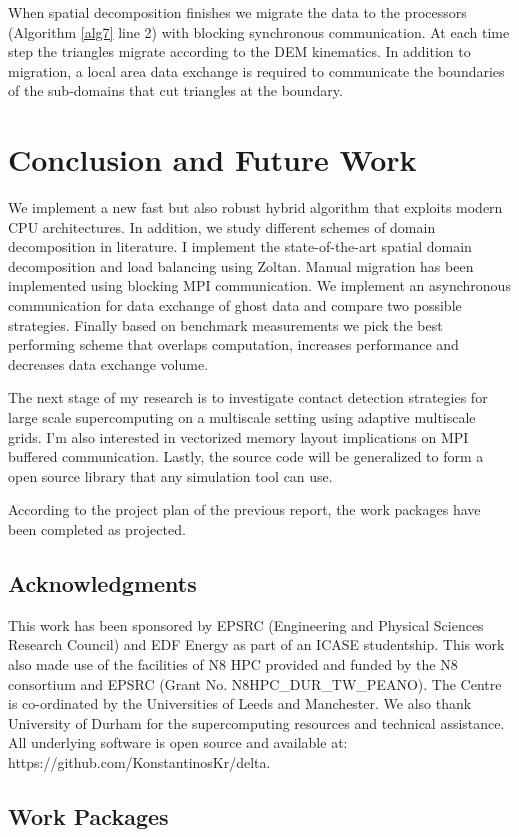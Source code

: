 \documentclass[times,12pt]{article}
\begin{document}
When spatial decomposition finishes we migrate the data to the processors (Algorithm \ref{alg7} line 2) with blocking synchronous communication. At each time step the triangles migrate according to the DEM kinematics. In addition to migration, a local area data exchange is required to communicate the boundaries of the sub-domains that cut triangles at the boundary. 

\section{Conclusion and Future Work}

We implement a new fast but also robust hybrid algorithm that exploits modern CPU architectures. In addition, we study different schemes of domain decomposition in literature. I implement the state-of-the-art spatial domain decomposition and load balancing using Zoltan. Manual migration has been implemented using blocking MPI communication. We implement an asynchronous communication for data exchange of ghost data and compare two possible strategies. Finally based on benchmark measurements we pick the best performing scheme that overlaps computation, increases performance and decreases data exchange volume.

The next stage of my research is to investigate contact detection strategies for large scale supercomputing on a multiscale setting using adaptive multiscale grids. I'm also interested in vectorized memory layout implications on MPI buffered communication. Lastly, the source code will be generalized to form a open source library that any simulation tool can use. 

According to the project plan of the previous report, the work packages have been completed as projected.
 
\subsection{Acknowledgments}
This work has been sponsored by EPSRC (Engineering and Physical Sciences Research Council) and EDF Energy as part of an ICASE studentship. This work also made use of the facilities of N8 HPC provided and funded by the N8 consortium and EPSRC (Grant No. N8HPC{\_}DUR{\_}TW{\_}PEANO). The Centre is co-ordinated by the Universities of Leeds and Manchester. We also thank University of Durham for the supercomputing resources and technical assistance. All underlying software is open source and available at: https://github.com/KonstantinosKr/delta.

\subsection{Work Packages}

\clearpage
\nocite{*}
{}

\end{document}
